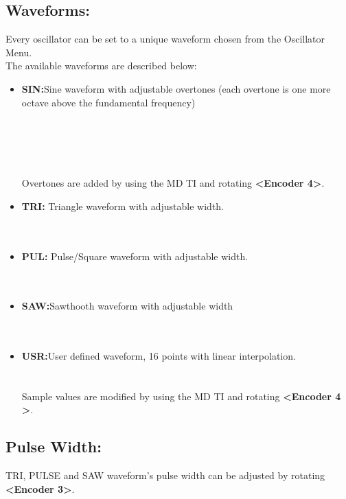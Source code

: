 \subsection{Waveforms:}
Every oscillator can be set to a unique waveform chosen from the Oscillator Menu.
\\
The available waveforms are described below:

\begin{itemize}
\item{\textbf{SIN:}}Sine waveform with adjustable overtones (each overtone is one more octave above the fundamental frequency)\\
\\\\
\\\\
\\Overtones are added by using the MD TI and rotating \textbf{<Encoder 4>}.
\item{\textbf{TRI:}} Triangle waveform with adjustable width.\\
\\\\
\item{\textbf{PUL:}} Pulse/Square waveform with adjustable width.\\
\\\\
\item{\textbf{SAW:}}Sawthooth waveform with adjustable width\\
\\\\
\item{\textbf{USR:}}User defined waveform, 16 points with linear interpolation.\\
\\\\
Sample values are modified by using the MD TI and rotating \textbf{<Encoder 4 >}.
\end{itemize}
\subsection{Pulse Width:}
TRI, PULSE and SAW waveform's pulse width can be adjusted by rotating \textbf{<Encoder 3>}.\\
\\
\newpage
